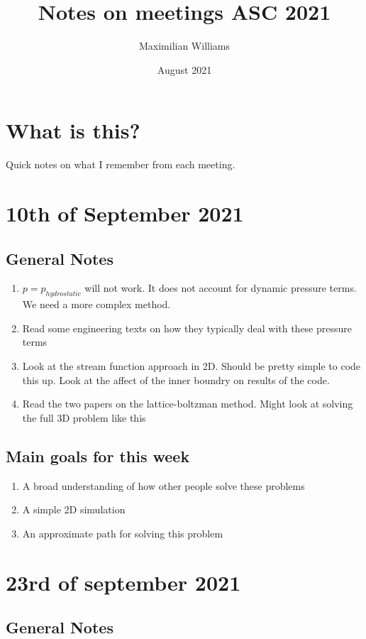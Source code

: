 \documentclass{article}
\title{Notes on meetings ASC 2021}
\author{Maximilian Williams }
\date{August 2021}
\begin{document}
\maketitle

\section*{What is this?}
Quick notes on what I remember from each meeting. 

\section*{10th of September 2021}
\subsection*{General Notes}
\begin{enumerate}
	\item $p = p_{hydrostatic}$ will not work. It does not account for dynamic pressure terms. We need a more complex method.
	\item Read some engineering texts on how they typically deal with these pressure terms
	\item Look at the stream function approach in 2D. Should be pretty simple to code this up. Look at the affect of the inner boundry on results of the code.
	\item Read the two papers on the lattice-boltzman method. Might look at solving the full 3D problem like this
\end{enumerate}


\subsection*{Main goals for this week}
\begin{enumerate}
	\item A broad understanding of how other people solve these problems
	\item A simple 2D simulation
	\item An approximate path for solving this problem
\end{enumerate}

\section*{23rd of september 2021}

\subsection*{General Notes}
\end{document}
